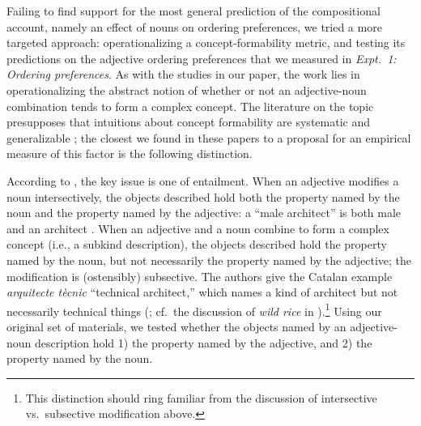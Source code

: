 \documentclass[12pt]{article}
\begin{document}
Failing to find support for the most general prediction of the compositional account, namely an effect of nouns on ordering preferences, we tried a more targeted approach: operationalizing a concept-formability metric, and testing its predictions on the adjective ordering preferences that we measured in \emph{Expt.~1: Ordering preferences}. As with the studies in our paper, the work lies in operationalizing the abstract notion of whether or not an adjective-noun combination tends to form a complex concept. The literature on the topic presupposes that intuitions about concept formability are systematic and generalizable \citep{McNally2004,svenonius2008}; the closest we found in these papers to a proposal for an empirical measure of this factor is the following distinction.

According to \citeauthor{McNally2004}, the key issue is one of entailment. When an adjective modifies a noun intersectively, the objects described hold both the property named by the noun and the property named by the adjective: a ``male architect'' is both male and an architect \citep[p.~179, ex.~2]{McNally2004}. When an adjective and a noun combine to form a complex concept (i.e., a subkind description), the objects described hold the property named by the noun, but not necessarily the property named by the adjective; the modification is (ostensibly) subsective. The authors give the Catalan example \emph{arquitecte t\`{e}cnic} ``technical architect,'' which names a kind of architect but not necessarily technical things (\citealp[p.~179, ex.~1]{McNally2004}; cf.~the discussion of \emph{wild rice} in \citealp{svenonius2008}).\footnote{This distinction should ring familiar from the discussion of intersective vs.~subsective modification above.} 
Using our original set of materials, we tested whether the objects named by an adjective-noun description hold 1) the property named by the adjective, and 2) the property named by the noun.


\end{document}
